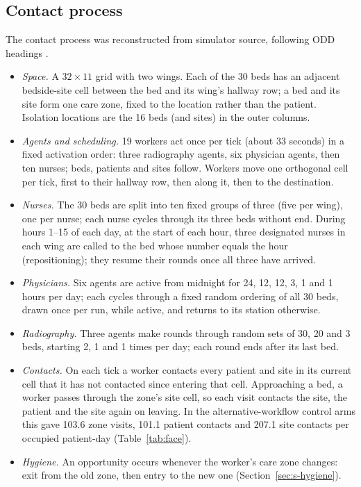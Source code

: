\documentclass[11pt]{article}
\begin{document}
\subsection{Contact process}\label{sec:s-contacts}
The contact process was reconstructed from simulator source, following ODD
headings \citep{grimm2020}.
\begin{itemize}
\item \emph{Space.} A $32\times11$ grid with two wings. Each of the 30 beds has an
adjacent bedside-site cell between the bed and its wing's hallway row; a bed and
its site form one care zone, fixed to the location rather than the patient.
Isolation locations are the 16 beds (and sites) in the outer columns.
\item \emph{Agents and scheduling.} 19 workers act once per tick (about 33 seconds)
in a fixed activation order: three radiography agents, six physician agents, then
ten nurses; beds, patients and sites follow. Workers move one orthogonal cell per
tick, first to their hallway row, then along it, then to the destination.
\item \emph{Nurses.} The 30 beds are split into ten fixed groups of three (five
per wing), one per nurse; each nurse cycles through its three beds without end.
During hours 1--15 of each day, at the start of each hour, three designated nurses
in each wing are called to the bed whose number equals the hour (repositioning);
they resume their rounds once all three have arrived.
\item \emph{Physicians.} Six agents are active from midnight for 24, 12, 12, 3, 1 and
1 hours per day; each cycles through a fixed random ordering of all 30 beds, drawn
once per run, while active, and returns to its station otherwise.
\item \emph{Radiography.} Three agents make rounds through random sets of 30, 20 and
3 beds, starting 2, 1 and 1 times per day; each round ends after its last bed.
\item \emph{Contacts.} On each tick a worker contacts every patient and site in its
current cell that it has not contacted since entering that cell. Approaching a
bed, a worker passes through the zone's site cell, so each visit contacts the
site, the patient and the site again on leaving. In the alternative-workflow
control arms this gave 103.6 zone visits, 101.1 patient contacts and 207.1 site
contacts per occupied patient-day (Table~\ref{tab:face}).
\item \emph{Hygiene.} An opportunity occurs whenever the worker's care zone
changes: exit from the old zone, then entry to the new one (Section~\ref{sec:s-hygiene}).

\end{itemize}
\end{document}
